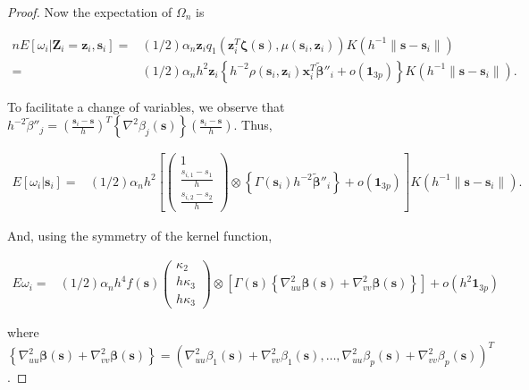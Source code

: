 \documentclass[authoryear,review, 12pt]{elsarticle}
\begin{document}
\begin{proof}
Now the expectation of $\Omega_{n}$ is 

\begin{align*}
nE\left[\omega_{i}|\bm{Z}_{i}=\bm{z}_{i},\bm{s}_{i}\right]= & \left(1/2\right)\alpha_{n}\bm{z}_{i}q_{1}\left(\bm{z}_{i}^{T}\bm{\zeta}\left(\bm{s}\right),\mu\left(\bm{s}_{i},\bm{z}_{i}\right)\right)K\left(h^{-1}\|\bm{s}-\bm{s}_{i}\|\right)\\
= & \left(1/2\right)\alpha_{n}h^{2}\bm{z}_{i}\left\{ h^{-2}\rho\left(\bm{s}_{i},\bm{z}_{i}\right)\bm{x}_{i}^{T}\tilde{\bm{\beta}}''_{i}+o\left(\bm{1}_{3p}\right)\right\} K\left(h^{-1}\|\bm{s}-\bm{s}_{i}\|\right).
\end{align*}


To facilitate a change of variables, we observe that $h^{-2}\tilde{\beta}''_{j}=\left(\frac{\bm{s}_{i}-\bm{s}}{h}\right)^{T}\left\{ \nabla^{2}\beta_{j}\left(\bm{s}\right)\right\} \left(\frac{\bm{s}_{i}-\bm{s}}{h}\right)$.
Thus,

\begin{align*}
E\left[\omega_{i}|\bm{s}_{i}\right]= & \left(1/2\right)\alpha_{n}h^{2}\left[\left(\begin{array}{c}
1\\
\frac{s_{i,1}-s_{1}}{h}\\
\frac{s_{i,2}-s_{2}}{h}
\end{array}\right)\otimes\left\{ \Gamma\left(\bm{s}_{i}\right)h^{-2}\tilde{\bm{\beta}}''_{i}\right\} +o\left(\bm{1}_{3p}\right)\right]K\left(h^{-1}\|\bm{s}-\bm{s}_{i}\|\right).
\end{align*}


And, using the symmetry of the kernel function,

\begin{align*}
E\omega_{i}= & \left(1/2\right)\alpha_{n}h^{4}f\left(\bm{s}\right)\left(\begin{array}{c}
\kappa_{2}\\
h\kappa_{3}\\
h\kappa_{3}
\end{array}\right)\otimes\left[\Gamma\left(\bm{s}\right)\left\{ \nabla_{uu}^{2}\bm{\beta}\left(\bm{s}\right)+\nabla_{vv}^{2}\bm{\beta}\left(\bm{s}\right)\right\} \right]+o\left(h^{2}\bm{1}_{3p}\right)
\end{align*}


where $\left\{ \nabla_{uu}^{2}\bm{\beta}\left(\bm{s}\right)+\nabla_{vv}^{2}\bm{\beta}\left(\bm{s}\right)\right\} =\left(\nabla_{uu}^{2}\beta_{1}\left(\bm{s}\right)+\nabla_{vv}^{2}\beta_{1}\left(\bm{s}\right),\dots,\nabla_{uu}^{2}\beta_{p}\left(\bm{s}\right)+\nabla_{vv}^{2}\beta_{p}\left(\bm{s}\right)\right)^{T}$.


\end{proof}
\end{document}

